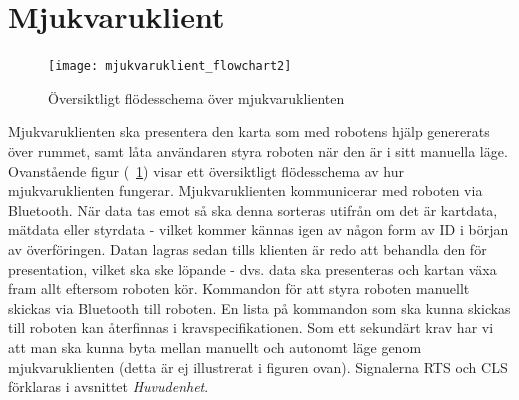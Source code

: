 \documentclass{article}
\begin{document}
\section{Mjukvaruklient}
\begin{figure}[H]
\centering
\texttt{[image: mjukvaruklient\_flowchart2]}
\caption{Översiktligt flödesschema över mjukvaruklienten}
\label{fig:mjukvaruklient}
\end{figure}
Mjukvaruklienten ska presentera den karta som med robotens hjälp genererats över rummet, samt låta användaren styra roboten när den är i sitt manuella läge. Ovanstående figur (~\ref{fig:mjukvaruklient}) visar ett översiktligt flödesschema av hur mjukvaruklienten fungerar. Mjukvaruklienten kommunicerar med roboten via Bluetooth. När data tas emot så ska denna sorteras utifrån om det är kartdata, mätdata eller styrdata - vilket kommer kännas igen av någon form av ID i början av överföringen. Datan lagras sedan tills klienten är redo att behandla den för presentation, vilket ska ske löpande - dvs. data ska presenteras och kartan växa fram allt eftersom roboten kör. Kommandon för att styra roboten manuellt skickas via Bluetooth till roboten. En lista på kommandon som ska kunna skickas till roboten kan återfinnas i kravspecifikationen. Som ett sekundärt krav har vi att man ska kunna byta mellan manuellt och autonomt läge genom mjukvaruklienten (detta är ej illustrerat i figuren ovan). Signalerna RTS och CLS förklaras i avsnittet \textit{Huvudenhet}. 
\end{document}
